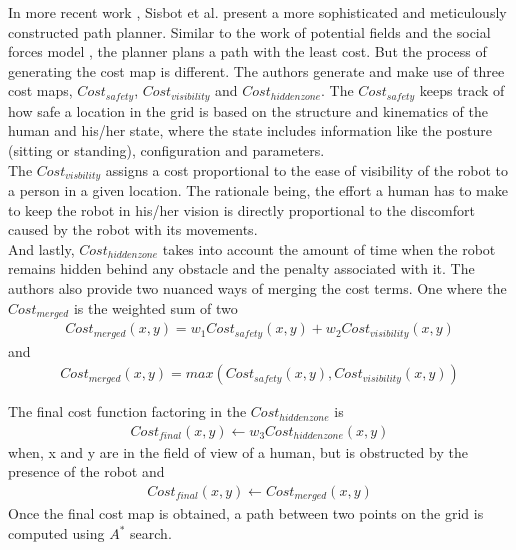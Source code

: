 In more recent work \cite{sisbot_human_2007}, Sisbot et al. present a more sophisticated and meticulously constructed path planner. Similar to the work of potential fields \cite{khatib_1986} and the social forces model \cite{helbing_social_1998}, the planner plans a path with the least cost. But the process of generating the cost map is different.
The authors generate and make use of three cost maps, $Cost_{safety}$, $Cost_{visibility}$ and $Cost_{hidden zone}$.
The $Cost_{safety}$ keeps track of how safe a location in the grid is based on the structure and kinematics of the human and his/her state, where the state includes information like the posture (sitting or standing), configuration and parameters.\\
The $Cost_{visbility}$ assigns a cost proportional to the ease of visibility of the robot to a person in a given location. The rationale being, the effort a human has to make to keep the robot in his/her vision is directly proportional to the discomfort caused by the robot with its movements.\\
And lastly, $Cost_{hidden zone}$ takes into account the amount of time when the robot remains hidden behind any obstacle and the penalty associated with it. 
The authors also provide two nuanced ways of merging the cost terms. One where the $Cost_{merged}$ is the weighted sum of two
\begin{align}
Cost_{merged}(x,y) = w_{1}Cost_{safety}(x,y) + w_{2}Cost_{visibility}(x,y)
\end{align}
and 
\begin{align}
Cost_{merged}(x,y) = max(Cost_{safety}(x,y), Cost_{visibility}(x,y))
\end{align}

The final cost function factoring in the $Cost_{hidden zone}$ is
\begin{align}
Cost_{final}(x,y) \leftarrow w_{3} Cost_{hidden zone}(x,y)
\end{align}
when, x and y are in the field of view of a human, but is obstructed by the presence of the robot and 
\begin{align}
Cost_{final}(x,y) \leftarrow Cost_{merged}(x,y)
\end{align}
Once the final cost map is obtained, a path between two points on the grid is computed using $A^*$ search.

